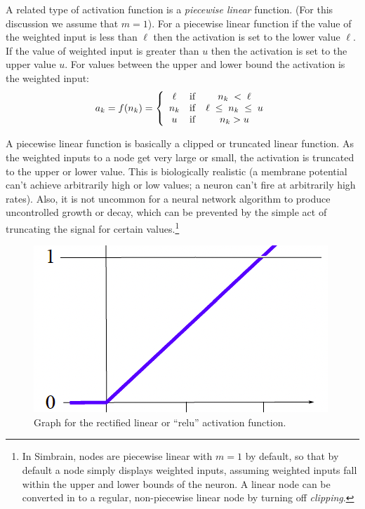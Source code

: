 A related type of activation function is a \emph{piecewise linear} function. (For this discussion we assume that $m=1$). For a piecewise linear function if the  value of the weighted input is less than $\ell$ then the activation is set to the lower value $\ell$. If the value of weighted input is greater than $u$ then the  activation is set to the upper value $u$. For values between the upper and lower bound the activation is the weighted input:
\begin{eqnarray*}
a_k = f(n_k) =  
\left\{
      \begin{array}{clc}
                  \ell      & {\rm if} &   n_k\; < \; \ell             \\
              n_k  & {\rm if} &  \ell \;\leq\; n_k \;\leq\; u \\
               u     & {\rm if} &    n_k > u
      \end{array} 
\right.
\end{eqnarray*}

A piecewise linear function is basically a clipped or truncated linear function. As the weighted inputs to a node get very large or small, the activation is truncated to the upper or lower value. This is biologically realistic (a membrane potential can't achieve arbitrarily high or low values; a neuron can't fire at arbitrarily high rates). Also, it is not uncommon for a neural network algorithm to produce uncontrolled growth or decay, which can be prevented by the simple act of truncating the signal for certain values.\footnote{In Simbrain, nodes are piecewise linear with $m=1$ by default, so that by default a node simply displays weighted inputs, assuming weighted inputs fall within the upper and lower bounds of the neuron. A linear node can be converted in to a regular, non-piecewise linear node by turning off  \emph{clipping}.}

\begin{figure}[h]
\centering
\includegraphics[scale=.4]{./images/relu.png}
\caption[Scott Hotton.]{Graph for the rectified linear or ``relu'' activation function.}
\label{relu}
\end{figure}

